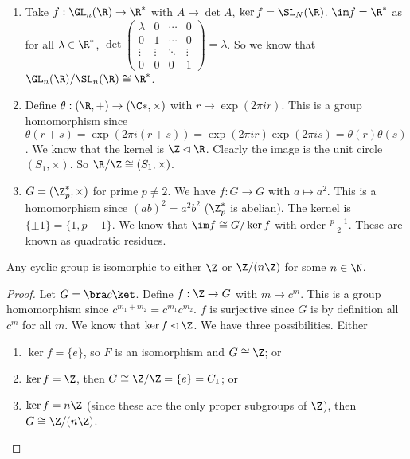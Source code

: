\documentclass[a4paper]{article}
\begin{document}
\begin{eg}\leavevmode
  \begin{enumerate}
    \item Take $f: \GL_n(\R) \to \R^*$ with $A \mapsto \det A$, $\ker f = \SL_N(\R)$. $\im f = \R^*$ as for all $\lambda \in \R^*$, $\det
      \begin{pmatrix}
        \lambda & 0 & \cdots & 0 \\
        0 &1 & \cdots & 0\\
        \vdots &\vdots &\ddots & \vdots\\
        0& 0 & 0 &1
      \end{pmatrix}
      = \lambda$. So we know that $\GL_n(\R)/\SL_n(\R) \cong \R^*$.
    \item Define $\theta: (\R, +) \to (\C*, \times)$ with $r\mapsto \exp(2\pi ir)$. This is a group homomorphism since $\theta(r + s) = \exp(2\pi i(r + s)) = \exp (2\pi i r)\exp (2\pi i s) = \theta(r)\theta(s)$. We know that the kernel is $\Z\lhd \R$. Clearly the image is the unit circle $(S_1, \times)$. So $\R/\Z \cong (S_1, \times)$.
    \item $G = (\Z_p^*, \times)$ for prime $p\not= 2$. We have $f: G\to G$ with $a\mapsto a^2$. This is a homomorphism since $(ab)^2 = a^2b^2$ ($\Z_p^*$ is abelian). The kernel is $\{\pm 1\} = \{1, p - 1\}$. We know that $\im f\cong G/\ker f$ with order $\frac{p - 1}{2}$. These are known as quadratic residues.
  \end{enumerate}
\end{eg}

\begin{lemma}
  Any cyclic group is isomorphic to either $\Z$ or $\Z/(n\Z)$ for some $n\in \N$.
\end{lemma}

\begin{proof}
  Let $G = \bra c\ket$. Define $f: \Z \to G$ with $m\mapsto c^m$. This is a group homomorphism since $c^{m_1 + m_2} = c^{m_1}c^{m_2}$. $f$ is surjective since $G$ is by definition all $c^m$ for all $m$. We know that $\ker f\lhd \Z$. We have three possibilities. Either
  \begin{enumerate}
    \item $\ker f = \{e\}$, so $F$ is an isomorphism and $G\cong \Z$; or
    \item $\ker f = \Z$, then $G\cong \Z/\Z = \{e\} = C_1$; or
    \item $\ker f = n\Z$ (since these are the only proper subgroups of $\Z$), then $G\cong \Z/(n\Z)$.\qedhere
  \end{enumerate}
\end{proof}
\end{document}
